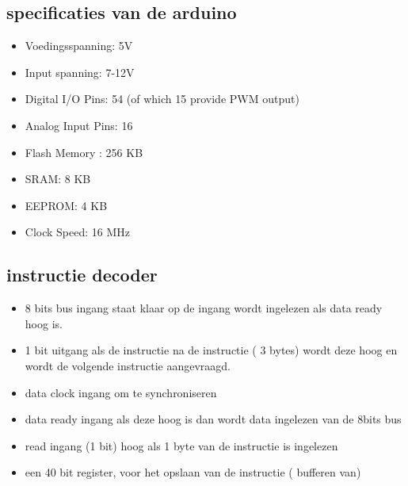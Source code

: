 \documentclass{scrartcl}
\begin{document}
\subsection {specificaties van de arduino}
\begin {itemize}
\item Voedingsspanning:	 5V
\item Input spanning: 	7-12V
\item Digital I/O Pins: 	54 (of which 15 provide PWM output)
\item Analog Input Pins:	16
\item Flash Memory	:	256 KB 
\item SRAM:			8 KB
\item EEPROM:		4 KB
\item Clock Speed:		16 MHz

\end {itemize}

\subsection { instructie decoder}
\begin {itemize}
\item 8 bits bus ingang staat klaar op de ingang wordt ingelezen als data ready hoog is.
\item 1 bit uitgang als de instructie na de instructie ( 3 bytes) wordt deze hoog en wordt de volgende instructie aangevraagd.
\item data clock ingang om te synchroniseren 
\item data ready ingang als deze hoog is dan wordt data ingelezen van de 8bits bus
\item read ingang (1 bit) hoog als 1 byte van de instructie is ingelezen 
\item een 40 bit register, voor het opslaan van de instructie ( bufferen van)
\end {itemize}
\end{document}
